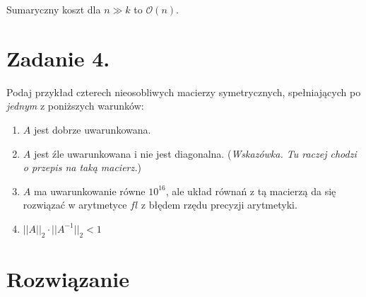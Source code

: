 \documentclass[a4paper]{article}
\begin{document}
        Sumaryczny koszt dla $n \gg k$ to $\mathcal{O}(n)$.

    \section*{Zadanie 4.}

        Podaj przykład czterech nieosobliwych macierzy symetrycznych, spełniających po \textit{jednym} z poniższych warunków:

        \begin{enumerate}[label=(\alph*)]
            \item
                $A$ jest dobrze uwarunkowana.

            \item
                $A$ jest źle uwarunkowana i nie jest diagonalna.
                (\textit{Wskazówka.
                Tu raczej chodzi o przepis na taką macierz.})

            \item
                $A$ ma uwarunkowanie równe $10^{16}$,
                ale układ równań z tą macierzą da się rozwiązać w
                arytmetyce $fl$ z błędem rzędu precyzji arytmetyki.

            \item
                $||A||_2 \cdot ||A^{-1}||_2 < 1$
        \end{enumerate}



    \section*{\large Rozwiązanie}
\end{document}
